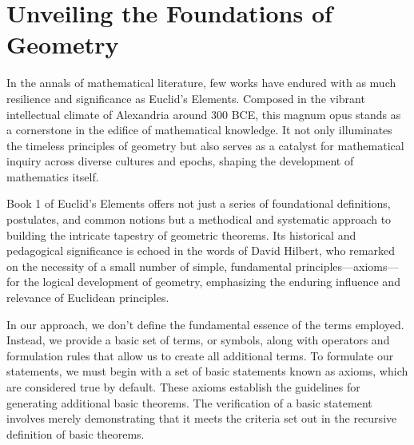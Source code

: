 \section{Unveiling the Foundations of Geometry}

In the annals of mathematical literature, few works have endured with as much resilience and significance as Euclid's Elements. Composed in the vibrant intellectual climate of Alexandria around 300 BCE, this magnum opus stands as a cornerstone in the edifice of mathematical knowledge. It not only illuminates the timeless principles of geometry but also serves as a catalyst for mathematical inquiry across diverse cultures and epochs, shaping the development of mathematics itself.

Book 1 of Euclid's Elements offers not just a series of foundational definitions, postulates, and common notions but a methodical and systematic approach to building the intricate tapestry of geometric theorems. Its historical and pedagogical significance is echoed in the words of David Hilbert, who remarked on the necessity of a small number of simple, fundamental principles—axioms—for the logical development of geometry, emphasizing the enduring influence and relevance of Euclidean principles.

In our approach, we don't define the fundamental essence of the terms employed. Instead, we provide a basic set of terms, or symbols, along with operators and formulation rules that allow us to create all additional terms. To formulate our statements, we must begin with a set of basic statements known as axioms, which are considered true by default. These axioms establish the guidelines for generating additional basic theorems. The verification of a basic statement involves merely demonstrating that it meets the criteria set out in the recursive definition of basic theorems.

